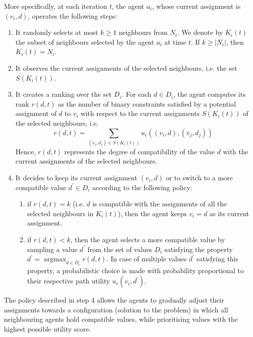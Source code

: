 More specifically, at each iteration $t$, the agent $a_i$, whose current assignment is $(v_i, d)$, operates the following steps:
\begin{enumerate}
    \item It randomly selects at most $k\geq1$ neighbours from $N_i$. We denote by $K_i(t)$ the subset of neighbours selected by the agent $a_i$ at time $t$. If $k\geq|N_i|$, then $K_i(t)=N_i$.
    \item It observes the current assignments of the selected neighbours, i.e. the set $S(K_i(t))$.  
    \item It creates a ranking over the set $D_i$. For each $d \in D_i$, the agent computes its rank $r(d,t)$ as the number of binary constraints satisfied by a potential assignment of $d$ to $v_i$ with respect to the current assignments $S(K_i(t))$ of the selected neighbours, i.e.     
    $$
    r(d,t) = \sum_{(v_j, d_j) \in S(K_i(t))} u_c \left((v_i, d),  (v_j, d_j)\right)
    $$
    Hence, $r(d,t)$ represents the degree of compatibility of the value $d$ with the current assignments of the selected neighbours.
    \item It decides to keep its current assignment $(v_i, d)$ or to switch to a more compatible value $d^{\prime} \in D_i$ according to the following policy: 
    \begin{enumerate}
        \item if $r(d,t) = k$  (i.e. $d$ is compatible with the assignments of all the selected neighbours in $K_i(t)$), then the agent keeps $v_i=d$ as its current assignment.
        \item if $r(d,t) < k$, then the agent selects a more compatible value by sampling a value $d^{\prime}$ from the set of values $D_i$ satisfying the property $d^{\prime} = \operatorname{argmax}_{d \in D_i} r(d,t)$. In case of multiple values $d^{\prime}$ satisfying this property, a probabilistic choice is made with probability proportional to their respective path utility $u_r(v_i, d^{\prime})$.
    \end{enumerate}
\end{enumerate} 
The policy described in step 4 allows the agents to gradually adjust their assignments towards a configuration (solution to the problem) in which all neighbouring agents hold compatible values, while prioritising values with the highest possible utility score.
